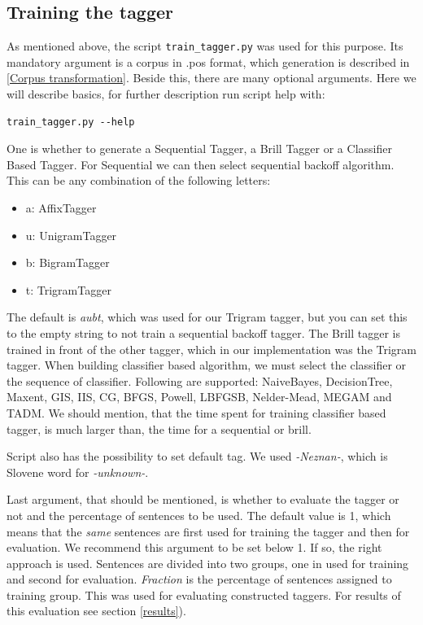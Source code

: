 \documentclass[10pt, conference, compsocconf]{IEEEtran}
\begin{document}
\subsection{Training the tagger} %
As mentioned above, the script \texttt{train\_tagger.py} was used for this purpose. Its mandatory argument is a corpus in .pos format, which generation is described in \ref{Corpus transformation}. Beside this, there are many optional arguments. Here we will describe basics, for further description run script help with:
\begin{lstlisting}
train_tagger.py --help
\end{lstlisting}
\par
One is whether to generate a Sequential Tagger, a Brill Tagger or a Classifier Based Tagger. For Sequential we can then select sequential backoff algorithm. This can be any combination of the following letters:
\begin{itemize}
\item a: AffixTagger
\item u: UnigramTagger
\item b: BigramTagger
\item t: TrigramTagger
\end{itemize}
The default is \textit{aubt}, which was used for our Trigram tagger, but you can set this to the empty string to not train a sequential backoff tagger. The Brill tagger is trained in front of the other tagger, which in our implementation was the Trigram tagger. When building classifier based algorithm, we must select the classifier or the sequence of classifier. Following are supported: NaiveBayes, DecisionTree, Maxent, GIS, IIS, CG, BFGS, Powell, LBFGSB, Nelder-Mead, MEGAM and TADM. We should mention, that the time spent for training classifier based tagger, is much larger than, the time for a sequential or brill.
\par
Script also has the possibility to set default tag. We used \textit{-Neznan-}, which is Slovene word for \textit{-unknown-}.
\par
Last argument, that should be mentioned, is whether to evaluate the tagger or not and the percentage of sentences to be used. The default value is 1, which means that the \textit{same} sentences are first used for training the tagger and then for evaluation. We recommend this argument to be set below 1. If so, the right approach is used.
Sentences are divided into two groups, one in used for training and second for evaluation. \textit{Fraction} is the percentage of sentences assigned to training group. 
This was used for evaluating constructed taggers. For results of this evaluation see section \ref{results}).
\end{document}
